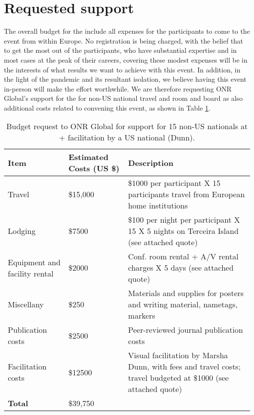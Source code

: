 \section{Requested  support}

The overall budget for the \symp include all expenses for the
participants to come to the event from within Europe. No registration
is being charged, with the belief that to get the most out of the
participants, who have substantial expertise and in most cases at the
peak of their careers, covering these modest expenses will be in the
interests of what results we want to achieve with this event. In
addition, in the light of the pandemic and its resultant isolation, we
believe having this event in-person will make the effort worthwhile.
We are therefore requesting ONR Global's support for the \symp for
non-US national travel and room and board as also additional costs
related to convening this event, as shown in Table
\ref{tab:nsf-budget}.

\begin{table}[!h]
  \footnotesize{
    \centering    
    \begin{tabular}{|p{3.0cm}|p{1.6cm}|p{10cm}|}
      \hline 
      \rowcolor{Gray}
      \bfseries Item& \bfseries Estimated Costs (US \$)&\bfseries Description\\
      \hline
      Travel & \$15,000 & \$1000 per participant X 15 participants
                          travel from European home institutions\\ 
      \hline
      Lodging& \$7500 & \$100 per night per participant X 15 X 5
                        nights on Terceira Island (see attached quote)\\
      \hline
      Equipment and facility rental &\$2000 & Conf. room rental + A/V
                                              rental charges X 5 days
                                              (see attached quote)\\
      \hline
      Miscellany& \$250 & Materials and supplies for posters and writing material,
                          nametags, markers\\
      \hline
      Publication costs& \$2500 & Peer-reviewed journal publication
                                  costs\\
      \hline
      Facilitation costs& \$12500 & Visual facilitation by Marsha
                                    Dunn, with fees and travel
                                    costs; travel budgeted at \$1000 (see attached quote)\\
      \hline
      \textbf{Total}& \$39,750&\\
      \hline        
  \end{tabular}
  \caption{Budget request to ONR Global for support for 15 non-US
    nationals at \sympe + facilitation by a US national (Dunn).}
  \label{tab:nsf-budget}
}
\end{table}

